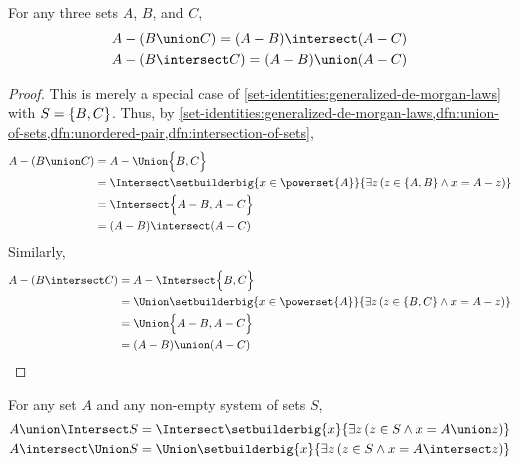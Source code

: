 \begin{thm}
    \label{set-identities:de-morgan-laws}
    For any three sets \( A \), \( B \), and \( C \),
    \begin{gather*}
        A - \mleft( B \union C \mright) = \mleft( A - B \mright) \intersect \mleft( A - C \mright) \\
        A - \mleft( B \intersect C \mright) = \mleft( A - B \mright) \union \mleft( A - C \mright)
    \end{gather*}
\end{thm}

\begin{proof}
    This is merely a special case of \cref{set-identities:generalized-de-morgan-laws} with
    \( S = \mleft\{ B, C \mright\} \).
    Thus, by \cref{set-identities:generalized-de-morgan-laws,dfn:union-of-sets,dfn:unordered-pair,dfn:intersection-of-sets},
    \begin{align*}
        A - \mleft( B \union C \mright)
        &=
        A - \Union \Big\{ B, C \Big\} \\
        &=
        \Intersect \setbuilderbig{x \in \powerset{A}}{\exists z \, \mleft( z \in \mleft\{ A, B\mright\} \land x = A - z \mright)}\\
        &=
        \Intersect \Big\{ A - B, A - C \Big\} \\
        &=
        \mleft( A - B \mright) \intersect \mleft( A - C \mright)
    \end{align*}
    Similarly,
    \begin{align*}
        A - \mleft( B \intersect C \mright)
        &=
        A - \Intersect \Big\{ B, C \Big\} \\
        &=
        \Union \setbuilderbig{x \in \powerset{A}}{\exists z \, \mleft( z \in \mleft\{ B,C \mright\} \land x = A - z \mright)}\\
        &=
        \Union \Big\{ A - B, A - C \Big\} \\
        &=
        \mleft( A - B \mright) \union \mleft( A - C \mright) \qedhere
    \end{align*}
\end{proof}

\begin{thm}
    \label{set-identities:generalized-distributive-laws}
    For any set \( A \) and any non-empty system of sets \( S \),
    \begin{gather*}
        A \union \Intersect S =
        \Intersect \setbuilderbig{x}{\exists z \, \mleft( z \in S \land x = A \union z \mright)}\\
        A \intersect \Union S =
        \Union \setbuilderbig{x}{\exists z \, \mleft( z \in S \land x = A \intersect z \mright)}
    \end{gather*}
\end{thm}

